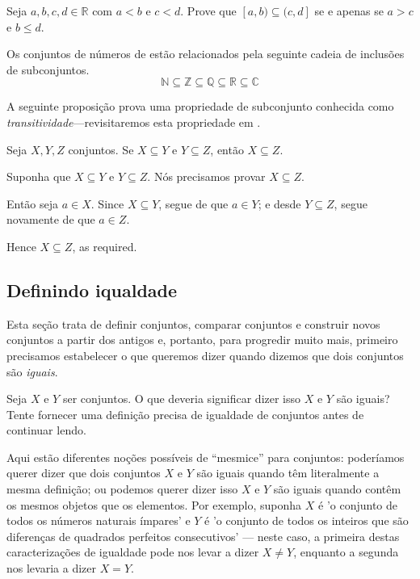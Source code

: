\begin{exercise}
Seja $a,b,c,d \in \mathbb{R}$ com $a<b$ e $c<d$. Prove que $[a,b) \subseteq (c,d]$ se e apenas se $a > c$ e $b \le d$.
\end{exercise}

\begin{example}
Os conjuntos de números de  estão relacionados pela seguinte cadeia de inclusões de subconjuntos.
\[ \mathbb{N} \subseteq \mathbb{Z} \subseteq \mathbb{Q} \subseteq \mathbb{R} \subseteq \mathbb{C} \]
\end{example}

A seguinte proposição prova uma propriedade de subconjunto conhecida como \textit{transitividade}---revisitaremos esta propriedade em .

\begin{proposition}
\label{propSubsetTransitive}
Seja $X,Y,Z$ conjuntos. Se $X \subseteq Y$ e $Y \subseteq Z$, então $X \subseteq Z$.
\end{proposition}

\begin{cproof}
Suponha que $X \subseteq Y$ e $Y \subseteq Z$. Nós precisamos provar $X \subseteq Z$.

Então seja $a \in X$. Since $X \subseteq Y$, segue de  que $a \in Y$; e desde $Y \subseteq Z$, segue novamente de  que $a \in Z$.

Hence $X \subseteq Z$, as required.
\end{cproof}

\subsection*{Definindo iqualdade}

Esta seção trata de definir conjuntos, comparar conjuntos e construir novos conjuntos a partir dos antigos e, portanto, para progredir muito mais, primeiro precisamos estabelecer o que queremos dizer quando dizemos que dois conjuntos são \textit{iguais}.

\begin{discussion}
\label{dscSetEquality}
Seja $X$ e $Y$ ser conjuntos. O que deveria significar dizer isso $X$ e $Y$ são iguais? Tente fornecer uma definição precisa de igualdade de conjuntos antes de continuar lendo.
\end{discussion}

Aqui estão diferentes noções possíveis de “mesmice” para conjuntos: poderíamos querer dizer que dois conjuntos $X$ e $Y$ são iguais quando têm literalmente a mesma definição; ou podemos querer dizer isso $X$ e $Y$ são iguais quando contêm os mesmos objetos que os elementos. Por exemplo, suponha $X$ é 'o conjunto de todos os números naturais ímpares' e $Y$ é 'o conjunto de todos os inteiros que são diferenças de quadrados perfeitos consecutivos' --- neste caso, a primeira destas caracterizações de igualdade pode nos levar a dizer $X \ne Y$, enquanto a segunda nos levaria a dizer $X = Y$.

